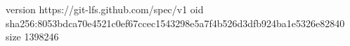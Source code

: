 version https://git-lfs.github.com/spec/v1
oid sha256:8053bdca70e4521c0ef67ccec1543298e5a7f4b526d3dfb924ba1e5326e82840
size 1398246

